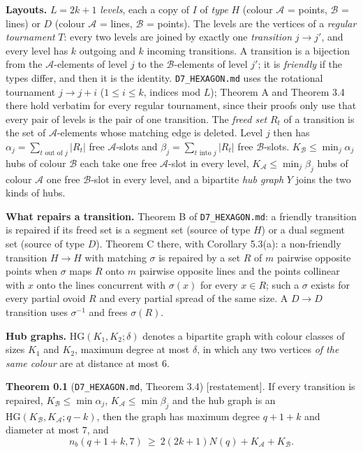 \documentclass[
  10pt,
]{article}
\begin{document}
\textbf{Layouts.} \(L=2k+1\) \emph{levels}, each a copy of \(I\) of
\emph{type} \(H\) (colour \(\mathcal A\) = points, \(\mathcal B\) =
lines) or \(D\) (colour \(\mathcal A\) = lines, \(\mathcal B\) =
points). The levels are the vertices of a \emph{regular tournament}
\(T\): every two levels are joined by exactly one \emph{transition}
\(j\to j'\), and every level has \(k\) outgoing and \(k\) incoming
transitions. A transition is a bijection from the
\(\mathcal A\)-elements of level \(j\) to the \(\mathcal B\)-elements of
level \(j'\); it is \emph{friendly} if the types differ, and then it is
the identity. \texttt{D7\_HEXAGON.md} uses the rotational tournament
\(j\to j+i\) (\(1\le i\le k\), indices mod \(L\)); Theorem A and Theorem
3.4 there hold verbatim for every regular tournament, since their proofs
only use that every pair of levels is the pair of one transition. The
\emph{freed set} \(R_t\) of a transition is the set of
\(\mathcal A\)-elements whose matching edge is deleted. Level \(j\) then
has \(\alpha_j=\sum_{t\text{ out of }j}|R_t|\) free \(\mathcal A\)-slots
and \(\beta_j=\sum_{t\text{ into }j}|R_t|\) free \(\mathcal B\)-slots.
\(K_{\mathcal B}\le\min_j\alpha_j\) hubs of colour \(\mathcal B\) each
take one free \(\mathcal A\)-slot in every level,
\(K_{\mathcal A}\le\min_j\beta_j\) hubs of colour \(\mathcal A\) one
free \(\mathcal B\)-slot in every level, and a bipartite \emph{hub
graph} \(Y\) joins the two kinds of hubs.

\textbf{What repairs a transition.} Theorem B of
\texttt{D7\_HEXAGON.md}: a friendly transition is repaired if its freed
set is a segment set (source of type \(H\)) or a dual segment set
(source of type \(D\)). Theorem C there, with Corollary 5.3(a): a
non-friendly transition \(H\to H\) with matching \(\sigma\) is repaired
by a set \(R\) of \(m\) pairwise opposite points when \(\sigma\) maps
\(R\) onto \(m\) pairwise opposite lines and the points collinear with
\(x\) onto the lines concurrent with \(\sigma(x)\) for every \(x\in R\);
such a \(\sigma\) exists for every partial ovoid \(R\) and every partial
spread of the same size. A \(D\to D\) transition uses \(\sigma^{-1}\)
and frees \(\sigma(R)\).

\textbf{Hub graphs.} \(\mathrm{HG}(K_1,K_2;\delta)\) denotes a bipartite
graph with colour classes of sizes \(K_1\) and \(K_2\), maximum degree
at most \(\delta\), in which any two vertices \emph{of the same colour}
are at distance at most \(6\).

\textbf{Theorem 0.1} (\texttt{D7\_HEXAGON.md}, Theorem 3.4)
{[}restatement{]}. If every transition is repaired,
\(K_{\mathcal B}\le\min \alpha_j\), \(K_{\mathcal A}\le\min\beta_j\) and
the hub graph is an \(\mathrm{HG}(K_{\mathcal B},K_{\mathcal A};q-k)\),
then the graph has maximum degree \(q+1+k\) and diameter at most \(7\),
and \[n_b(q+1+k,7)\ \ge\ 2(2k+1)N(q)+K_{\mathcal A}+K_{\mathcal B}.\]
\end{document}
